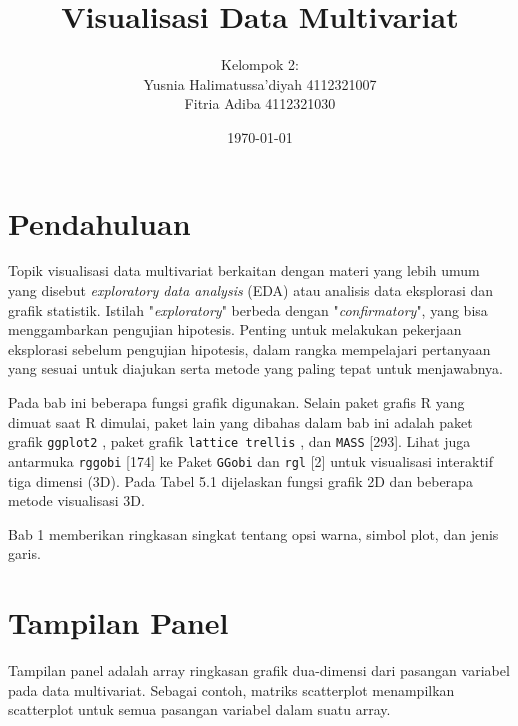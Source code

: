 \documentclass[a4paper,12pt]{article}
\theoremstyle{definition}
\begin{document}
    \title{Visualisasi Data Multivariat}
 \author{Kelompok 2: \\
    Yusnia Halimatussa'diyah 4112321007\\
    Fitria Adiba 4112321030\\}
\date{\today}
\begin{titlepage}
    \maketitle
\end{titlepage}

\section{Pendahuluan}
Topik visualisasi data multivariat berkaitan dengan materi yang lebih umum yang disebut \textit{exploratory data analysis} (EDA) atau analisis data eksplorasi dan grafik statistik. Istilah "\textit{exploratory}" berbeda dengan "\textit{confirmatory}", yang bisa menggambarkan pengujian hipotesis. Penting untuk melakukan pekerjaan eksplorasi sebelum pengujian hipotesis, dalam rangka mempelajari pertanyaan yang sesuai untuk diajukan serta metode yang paling tepat untuk menjawabnya. 

Pada bab ini beberapa fungsi grafik digunakan. Selain paket grafis R yang dimuat saat R dimulai, paket lain yang dibahas dalam bab ini adalah paket grafik \texttt{ggplot2} \cite{Wickham2016}, paket grafik \texttt{lattice trellis} \cite{Sarkar2008}, dan \texttt{MASS} [293]. Lihat juga antarmuka \texttt{rggobi} [174] ke Paket \texttt{GGobi} dan \texttt{rgl} [2] untuk visualisasi interaktif tiga dimensi (3D). Pada Tabel 5.1 dijelaskan fungsi grafik 2D dan beberapa metode visualisasi 3D.

Bab 1 memberikan ringkasan singkat tentang opsi warna, simbol plot, dan jenis garis.

\section{Tampilan Panel}
Tampilan panel adalah array ringkasan grafik dua-dimensi dari pasangan variabel pada data multivariat. Sebagai contoh, matriks scatterplot menampilkan scatterplot untuk semua pasangan variabel dalam suatu array. 
\end{document}
